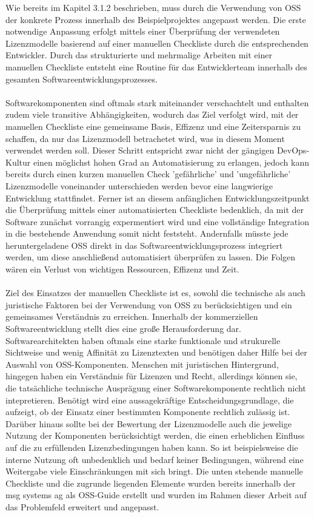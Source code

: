 Wie bereits im Kapitel 3.1.2 beschrieben, muss durch die Verwendung von OSS der konkrete Prozess innerhalb des Beispielprojektes angepasst werden. Die erste notwendige Anpassung erfolgt mittels einer Überprüfung der verwendeten Lizenzmodelle basierend auf einer manuellen Checkliste durch die entsprechenden Entwickler. Durch das strukturierte und mehrmalige Arbeiten mit einer manuellen Checkliste entsteht eine Routine für das Entwicklerteam innerhalb des gesamten Softwareentwicklungsprozesses.\\\\ Softwarekomponenten sind oftmals stark miteinander verschachtelt und enthalten zudem viele transitive Abhängigkeiten, wodurch das Ziel verfolgt wird, mit der manuellen Checkliste eine gemeinsame Basis, Effizenz und eine Zeitersparnis zu schaffen, da nur das Lizenzmodell betrachetet wird, was in diesem Moment verwendet werden soll. Dieser Schritt entspricht zwar nicht der gängigen DevOps-Kultur einen möglichst hohen Grad an Automatisierung zu erlangen, jedoch kann bereits durch einen kurzen manuellen Check 'gefährliche' und 'ungefährliche' Lizenzmodelle voneinander unterschieden werden bevor eine langwierige Entwicklung stattfindet. Ferner ist an diesem anfänglichen Entwicklungszeitpunkt die Überprüfung mittels einer automatisierten Checkliste bedenklich, da mit der Software zunächst vorrangig expermentiert wird und eine vollständige Integration in die bestehende Anwendung somit nicht feststeht. Andernfalls müsste jede heruntergeladene OSS direkt in das Softwareentwicklungsprozess integriert werden, um diese anschließend automatisiert überprüfen zu lassen. Die Folgen wären ein Verlust von wichtigen Ressourcen, Effizenz und Zeit.\\\\ Ziel des Einsatzes der manuellen Checkliste ist es, sowohl die technische als auch juristische Faktoren bei der Verwendung von OSS zu berücksichtigen und ein gemeinsames Verständnis zu erreichen. Innerhalb der kommerziellen Softwareentwicklung stellt dies eine große Herausforderung dar. Softwarearchitekten haben oftmals eine starke funktionale und strukurelle Sichtweise und wenig Affinität zu Lizenztexten und benötigen daher Hilfe bei der Auswahl von OSS-Komponenten. Menschen mit juristischen Hintergrund,  hingegen haben ein Verständnis für Lizenzen und Recht, allerdings können sie, die tatsächliche technische Ausprägung einer Softwarekomponente rechtlich nicht intepretieren. Benötigt wird eine aussagekräftige Entscheidungsgrundlage, die aufzeigt, ob der Einsatz einer bestimmten Komponente rechtlich zulässig ist. Darüber hinaus sollte bei der Bewertung der Lizenzmodelle auch die jewelige Nutzung der Komponenten berücksichtigt werden, die einen erheblichen Einfluss auf die zu erfüllenden Lizenzbedingungen haben kann. So ist beispielsweise die interne Nutzung oft unbedenklich und bedarf keiner Bedingungen, während eine Weitergabe viele Einschränkungen mit sich bringt. Die unten stehende manuelle Checkliste und die zugrunde liegenden Elemente wurden bereits innerhalb der msg systems ag als OSS-Guide erstellt und wurden im Rahmen dieser Arbeit auf das Problemfeld erweitert und angepasst.

